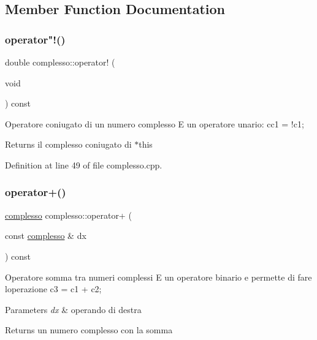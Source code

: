 \subsection{Member Function Documentation}
\mbox{\label{structcomplesso_a2a63410f0ab5c6c040fcd520a6dbf1ea}} 
\subsubsection{\texorpdfstring{operator"!()}{operator!()}}
{\footnotesize\ttfamily double complesso\+::operator! (\begin{DoxyParamCaption}\item[{void}]{ }\end{DoxyParamCaption}) const}

Operatore coniugato di un numero complesso E\textquotesingle{} un operatore unario\+: cc1 = !c1;

\begin{DoxyReturn}{Returns}
il complesso coniugato di $\ast$this 
\end{DoxyReturn}


Definition at line 49 of file complesso.\+cpp.

\mbox{\label{structcomplesso_aed83284e359857ed16b502af59b0cb66}} 
\subsubsection{\texorpdfstring{operator+()}{operator+()}}
{\footnotesize\ttfamily \mbox{\hyperlink{structcomplesso}{complesso}} complesso\+::operator+ (\begin{DoxyParamCaption}\item[{const \mbox{\hyperlink{structcomplesso}{complesso}} \&}]{dx }\end{DoxyParamCaption}) const}

Operatore somma tra numeri complessi E\textquotesingle{} un operatore binario e permette di fare l\textquotesingle{}operazione c3 = c1 + c2;


\begin{DoxyParams}{Parameters}
{\em dx} & operando di destra \\
\hline
\end{DoxyParams}
\begin{DoxyReturn}{Returns}
un numero complesso con la somma 
\end{DoxyReturn}


